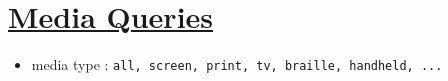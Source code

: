 \hypertarget{media-queries7}{%
\section{\texorpdfstring{\href{https://developer.mozilla.org/fr/docs/CSS/Media_queries}{Media
Queries}}{Media Queries}}\label{media-queries7}}

\begin{itemize}
\tightlist
\item
  media type :
  \textenglish{\texttt{all,\ screen,\ print,\ tv,\ braille,\ handheld,\ ...}}
\end{itemize}

\begin{english}

\begin{Shaded}
\begin{Highlighting}[]
 \KeywordTok{/\textgreater{}}
 \KeywordTok{/\textgreater{}}
\end{Highlighting}
\end{Shaded}

\end{english}

